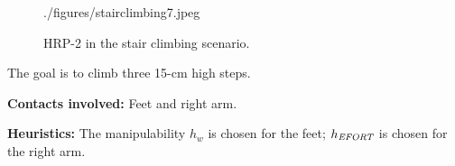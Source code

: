 \documentclass[journal]{IEEEtran}
\begin{document}
\begin{figure}[h!t!]
\begin{center}
    {./figures/stairclimbing7.jpeg}
  \caption{
           HRP-2 in the stair climbing scenario. }
		   \label{fig:stair_robust}
  \end{center}
  \vspace{-0.5cm}
\end{figure}


The goal is to climb three 15-cm high steps.

\noindent\textbf{Contacts involved:} Feet and right arm.

\noindent\textbf{Heuristics:} The manipulability $h_w$ is chosen for the feet; $h_{\textrm{\it EFORT}}$ is chosen for the right arm.

\end{document}
